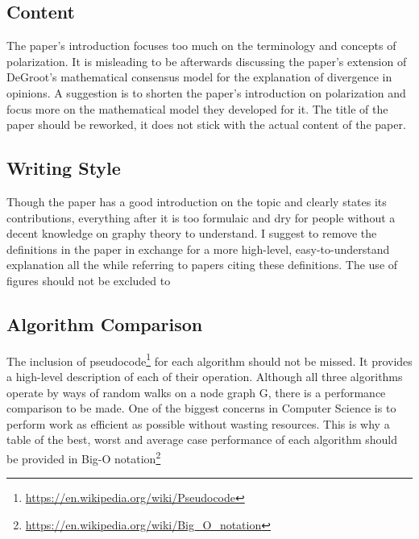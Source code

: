 \documentclass[14]{article}
\begin{document}
\subsection{Content}
The paper's introduction focuses too much on the terminology and concepts of polarization. It is misleading to be afterwards discussing the paper's extension of DeGroot's mathematical consensus model for the explanation of divergence in opinions. A suggestion is to shorten the paper's introduction on polarization and focus more on the mathematical model they developed for it. The title of the paper should be reworked, it does not stick with the actual content of the paper.

\subsection{Writing Style}
Though the paper has a good introduction on the topic and clearly states its contributions, everything after it is too formulaic and dry for people without a decent knowledge on graphy theory to understand. I suggest to remove the definitions in the paper in exchange for a more high-level, easy-to-understand explanation all the while referring to papers citing these definitions. The use of figures should not be excluded to 

\subsection{Algorithm Comparison}
The inclusion of pseudocode\footnote{\protect\url{https://en.wikipedia.org/wiki/Pseudocode}} for each algorithm should not be missed. It provides a high-level description of each of their operation.
\newline 
Although all three algorithms operate by ways of random walks on a node graph G, there is a performance comparison to be made. One of the biggest concerns in Computer Science is to perform work as efficient as possible without wasting resources. This is why a table of the best, worst and average case performance of each algorithm should be provided in Big-O notation\footnote{\protect\url{https://en.wikipedia.org/wiki/Big\_O\_notation}}

\end{document}
